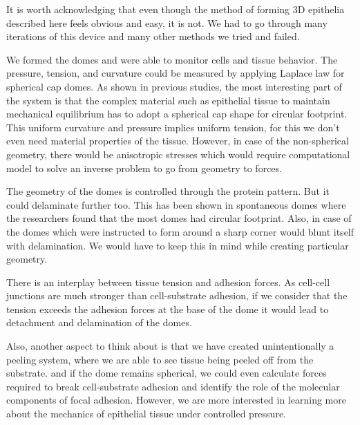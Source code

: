 It is worth acknowledging that even though the method of forming 3D
epithelia described here feels obvious and easy, it is not. We had to go
through many iterations of this device and many other methods we tried
and failed.

We formed the domes and were able to monitor cells and tissue behavior.
The pressure, tension, and curvature could be measured by applying
Laplace law for spherical cap domes. As shown in previous studies, the
most interesting part of the system is that the complex material such as
epithelial tissue to maintain mechanical equilibrium has to adopt a
spherical cap shape for circular footprint. This uniform curvature and
pressure implies uniform tension, for this we don't even need material
properties of the tissue. However, in case of the non-spherical
geometry, there would be anisotropic stresses which would require
computational model to solve an inverse problem to go from geometry to
forces.

The geometry of the domes is controlled through the protein pattern. But
it could delaminate further too. This has been shown in spontaneous
domes where the researchers found that the most domes had circular
footprint. Also, in case of the domes which were instructed to form
around a sharp corner would blunt itself with delamination. We would
have to keep this in mind while creating particular geometry.

There is an interplay between tissue tension and adhesion forces. As
cell-cell junctions are much stronger than cell-substrate adhesion, if
we consider that the tension exceeds the adhesion forces at the base of
the dome it would lead to detachment and delamination of the domes.

Also, another aspect to think about is that we have created
unintentionally a peeling system, where we are able to see tissue being
peeled off from the substrate. and if the dome remains spherical, we
could even calculate forces required to break cell-substrate adhesion
and identify the role of the molecular components of focal adhesion.
However, we are more interested in learning more about the mechanics of
epithelial tissue under controlled pressure.
